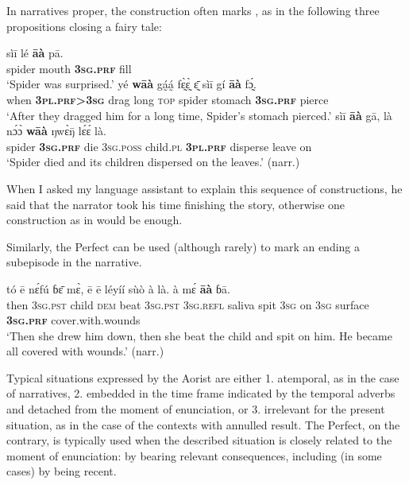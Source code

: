 \documentclass[output=paper]{LSP/langsci}
\begin{document}
In narratives proper, the  construction often marks , as in the following three propositions closing a fairy tale:

\begin{exe} \ex
\begin{xlist} \ex
\gll	sìī	lé	\textbf{āà}	pā.\\
		spider	mouth	\textbf{3\textsc{sg}.\textsc{prf}}	fill\\
\glt ‘Spider was surprised.’
\ex
\gll yé	\textbf{wāà}	gá̰á̰	fɛ̰̀ɛ̰̀	ɛ̰̄	sìī	gí	\textbf{āà}	fɔ̰́.\\
		when	\textbf{3\textsc{pl}.\textsc{prf}>3\textsc{sg}}	drag	long	\textsc{top}	spider stomach	\textbf{3\textsc{sg}.\textsc{prf}}	pierce \\
\glt ‘After they dragged him for a long time, Spider’s stomach pierced.’
\ex	
\label{khachexspider}
\gll sìī	\textbf{āà}	gā,	là	nɔ́ɔ̀	\textbf{wāà}	ŋwɛ̀ŋ̄	lɛ́ɛ́	là.\\
		spider	\textbf{3\textsc{sg}.\textsc{prf}}	die	3\textsc{sg}.\textsc{poss}	child.\textsc{pl}	\textbf{3\textsc{pl}.\textsc{prf}}	disperse	leave	on\\
\glt  ‘Spider died and its children dispersed on the leaves.’ (narr.)
\end{xlist}
\end{exe}

When I asked my language assistant to explain this sequence of  constructions, he said that the narrator took his time finishing the story, otherwise one  construction as in  would be enough.

Similarly, the Perfect can be used (although rarely) to mark an  ending a subepisode in the narrative. 

\begin{exe} \ex
\gll 	tó	ē	nɛ́fú	ɓɛ̄	mɛ̀,	ē	ē	léyíí	sùò	à	là. à	mɛ́	\textbf{āà}	ɓā.\\
	then	3\textsc{sg}.\textsc{pst}	child	\textsc{dem}	beat	3\textsc{sg}.\textsc{pst}	3\textsc{sg}.\textsc{refl}	saliva	spit	3\textsc{sg}	on 3\textsc{sg}	surface	\textbf{3\textsc{sg}.\textsc{prf}}	cover.with.wounds\\
\glt ‘Then she drew him down, then she beat the child and spit on him. He became all covered with wounds.’ (narr.)
\end{exe}



Typical situations expressed by the Aorist are either 1. atemporal, as in the case of narratives, 2. embedded in the time frame indicated by the temporal adverbs and detached from the moment of enunciation, or 3. irrelevant for the present situation, as in the case of the contexts with annulled result. The Perfect, on the contrary, is typically used when the described situation  is closely related to the moment of enunciation:  by bearing relevant consequences, including (in some cases) by being recent.
\end{document}
